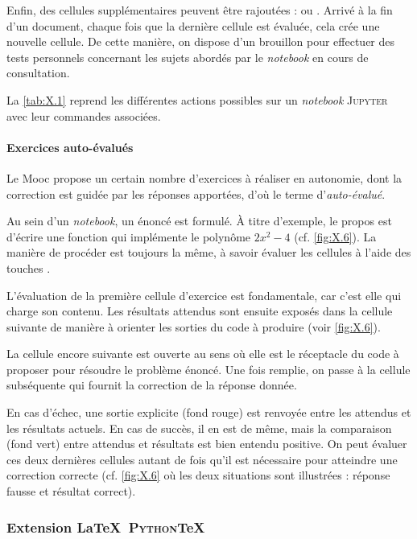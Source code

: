 Enfin, des cellules supplémentaires peuvent être rajoutées :  ou . Arrivé à la fin d'un document, chaque fois que la dernière cellule est évaluée, cela crée une nouvel\-le cellule. De cette manière, on dispose d'un brouillon pour effectuer des tests personnels concernant les sujets abordés par le \textit{notebook} en cours de consultation.

La \cref{tab:X.1} reprend les différentes actions possibles sur un \textit{notebook} \textsc{Jupyter} avec leur commandes associées.

\paragraph*{Exercices auto-évalués} Le Mooc propose un certain nombre d'exercices à réaliser en autonomie, dont la correction est guidée par les réponses apportées, d'où le terme d'\emph{auto-évalué}.

Au sein d'un \textit{notebook}, un énoncé est formulé. À titre d'exemple, le propos est d'écrire une fonction qui implémente le polynôme $2x^2 - 4$ (cf. \cref{fig:X.6}). La manière de procéder est toujours la même, à savoir évaluer les cellules à l'aide des touches . 

L'évaluation de la première cellule d'exercice est fondamentale, car c'est elle qui charge son contenu. Les résultats attendus sont ensuite exposés dans la cellule suivante de manière à orienter les sorties du code à produire (voir \cref{fig:X.6}).

La cellule encore suivante est ouverte au sens où elle est le réceptacle du code à proposer pour résoudre le problème énoncé. Une fois remplie, on passe à la cellule subséquente qui fournit la correction de la réponse donnée. 

En cas d'échec, une sortie explicite (fond rouge) est renvoyée entre les attendus et les résultats actuels. En cas de succès, il en est de même, mais la comparaison (fond vert) entre attendus et résultats est bien entendu positive. On peut évaluer ces deux dernières cellules autant de fois qu'il est nécessaire pour atteindre une correction correcte (cf. \cref{fig:X.6} où les deux situations sont illustrées : réponse fausse et résultat correct).


\subsubsection[Extension \LaTeX\ \textsc{Python}\TeX]{Extension \LaTeX\ \textsc{Python}\TeX}
\label{subsub:X.1.3.2}

